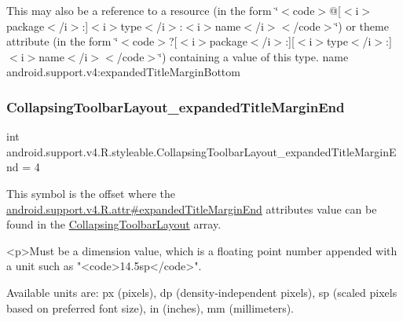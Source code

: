This may also be a reference to a resource (in the form \char`\"{}$<$code$>$@\mbox{[}$<$i$>$package$<$/i$>$\+:\mbox{]}$<$i$>$type$<$/i$>$\+:$<$i$>$name$<$/i$>$$<$/code$>$\char`\"{}) or theme attribute (in the form \char`\"{}$<$code$>$?\mbox{[}$<$i$>$package$<$/i$>$\+:\mbox{]}\mbox{[}$<$i$>$type$<$/i$>$\+:\mbox{]}$<$i$>$name$<$/i$>$$<$/code$>$\char`\"{}) containing a value of this type.  name android.\+support.\+v4\+:expanded\+Title\+Margin\+Bottom \mbox{\label{classandroid_1_1support_1_1v4_1_1R_1_1styleable_ad97c2223a320934180256ace4b0d2a40}} 
\subsubsection{\texorpdfstring{Collapsing\+Toolbar\+Layout\+\_\+expanded\+Title\+Margin\+End}{CollapsingToolbarLayout\_expandedTitleMarginEnd}}
{\footnotesize\ttfamily int android.\+support.\+v4.\+R.\+styleable.\+Collapsing\+Toolbar\+Layout\+\_\+expanded\+Title\+Margin\+End = 4\hspace{0.3cm}{\ttfamily [static]}}

This symbol is the offset where the \hyperlink{classandroid_1_1support_1_1v4_1_1R_1_1attr_a3e17776e2fac31da200756b8bba4c1b6}{android.\+support.\+v4.\+R.\+attr\#expanded\+Title\+Margin\+End} attribute\textquotesingle{}s value can be found in the \hyperlink{classandroid_1_1support_1_1v4_1_1R_1_1styleable_a91b20e27088c910353d38c1efde32aa9}{Collapsing\+Toolbar\+Layout} array.

\begin{DoxyVerb}      <p>Must be a dimension value, which is a floating point number appended with a unit such as "<code>14.5sp</code>".
\end{DoxyVerb}
 Available units are\+: px (pixels), dp (density-\/independent pixels), sp (scaled pixels based on preferred font size), in (inches), mm (millimeters). 

